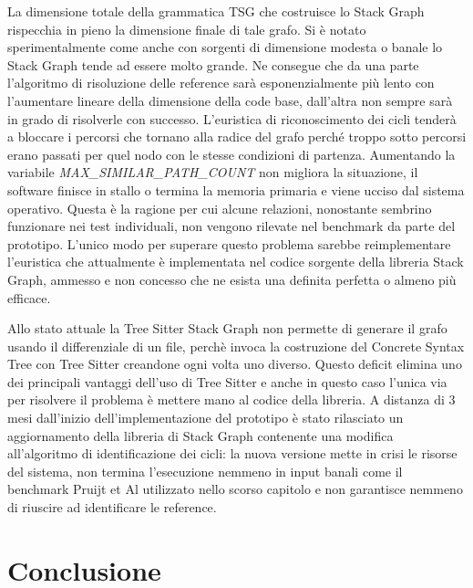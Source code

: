 La dimensione totale della grammatica TSG che costruisce lo Stack Graph rispecchia in pieno la dimensione finale di tale grafo. Si \`e notato sperimentalmente come anche con sorgenti di dimensione modesta o banale lo Stack Graph tende ad essere molto grande. Ne consegue che da una parte l'algoritmo di risoluzione delle reference sar\`a esponenzialmente pi\`u lento con l'aumentare lineare della dimensione della code base, dall'altra non sempre sar\`a in grado di risolverle con successo. L'euristica di riconoscimento dei cicli tender\`a a bloccare i percorsi che tornano alla radice del grafo perch\'e troppo sotto percorsi erano passati per quel nodo con le stesse condizioni di partenza. Aumentando la variabile \emph{MAX\_SIMILAR\_PATH\_COUNT} non migliora la situazione, il software finisce in stallo o termina la memoria primaria e viene ucciso dal sistema operativo. Questa \`e la ragione per cui alcune relazioni, nonostante sembrino funzionare nei test individuali, non vengono rilevate nel benchmark da parte del prototipo. L'unico modo per superare questo problema sarebbe reimplementare l'euristica che attualmente \`e implementata nel codice sorgente della libreria Stack Graph, ammesso e non concesso che ne esista una definita perfetta o almeno pi\`u efficace.


Allo stato attuale la Tree Sitter Stack Graph non permette di generare il grafo usando il differenziale di un file, perch\`e invoca la costruzione del Concrete Syntax Tree con Tree Sitter creandone ogni volta uno diverso. Questo deficit elimina uno dei principali vantaggi dell'uso di Tree Sitter e anche in questo caso l'unica via per risolvere il problema \`e mettere mano al codice della libreria. A distanza di 3 mesi dall'inizio dell'implementazione del prototipo \`e stato rilasciato un aggiornamento della libreria di Stack Graph contenente una modifica all'algoritmo di identificazione dei cicli: la nuova versione mette in crisi le risorse del sistema, non termina l'esecuzione nemmeno in input banali come il benchmark Pruijt et Al utilizzato nello scorso capitolo e non garantisce nemmeno di riuscire ad identificare le reference.

\section{Conclusione}

